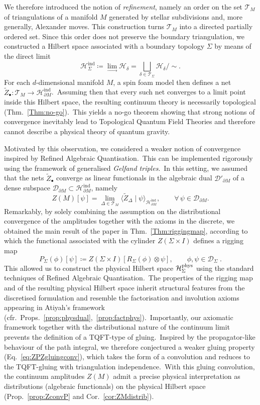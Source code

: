\documentclass[11pt]{article}
\newcommand{\Hphys}{\mathcal{H}_{\Sigma}^{\rm phys}}
\theoremstyle{definition}
\numberwithin{equation}{section}
\begin{document}
We therefore introduced the notion of \emph{refinement}, namely an order on the set $\mathcal{T}_M$ of triangulations of a manifold $M$ generated by stellar subdivisions and, more generally, Alexander moves. This construction turns $\mathcal{T}_M$ into a directed partially ordered set. Since this order does not preserve the boundary triangulation, we constructed a Hilbert space associated with a boundary topology $\Sigma$ by means of the direct limit
\[
\mathcal{H}^{\mathrm{ind}}_\Sigma \coloneqq 
\lim_{\longrightarrow}\mathcal{H}_\delta
=
\bigsqcup_{\delta\in \mathcal{T}_\Sigma}\mathcal{H}_\delta \Big/ \sim .
\]
For each $d$-dimensional manifold $M$, a spin foam model then defines a net 
$\tilde{Z}_\bullet : \mathcal{T}_M \to \mathcal{H}^{\mathrm{ind}}_{\partial M}$.~Assuming then that every such net converges to a limit point inside this Hilbert space, the resulting continuum theory is necessarily topological (Thm.~\ref{Thm:no-go}).~This yields a no-go theorem showing that strong notions of convergence inevitably lead to Topological Quantum Field Theories and therefore cannot describe a physical theory of quantum gravity.

Motivated by this observation, we considered a weaker notion of convergence inspired by Refined Algebraic Quantisation.~This can be implemented rigorously using the framework of generalised \emph{Gelfand triples}.~In this setting, we assumed that the nets $\tilde{Z}_\bullet$ converge as linear functionals in the algebraic dual $\mathcal{D}'_{\partial M}$ of a dense subspace $\mathcal{D}_{\partial M}\subset\mathcal{H}^{\mathrm{ind}}_{\partial M}$, namely
\[
Z(M)[\psi]
=
\lim_{\Delta\in\mathcal{T}_M}
\langle \tilde{Z}_\Delta \mid \psi \rangle_{\mathcal{H}^{\mathrm{ind}}_{\partial M}},
\qquad
\forall\,\psi\in\mathcal{D}_{\partial M}.
\]
Remarkably, by solely combining the assumption on the distributional convergence of the amplitudes together with the axioms in the discrete, we obtained the main result of the paper in Thm.~\ref{Thm:riggingmap}, according to which the functional associated with the cylinder $Z(\Sigma\times I)$ defines a rigging map
\[
P_\Sigma(\phi)[\psi]
\coloneqq
Z(\Sigma\times I)[R_\Sigma(\phi)\otimes\psi],
\qquad
\phi,\psi\in\mathcal{D}_\Sigma\;.
\]
This allowed us to construct the physical Hilbert space $\Hphys$ using the standard techniques of Refined Algebraic Quantisation.~The properties of the rigging map and of the resulting physical Hilbert space inherit structural features from the discretised formulation and resemble the factorisation and involution axioms appearing in Atiyah’s framework (cfr.~Props.~\ref{prop:physdual},~\ref{prop:factphys}).~Importantly, our axiomatic framework together with the distributional nature of the continuum limit prevents the definition of a TQFT-type of gluing.~Inspired by the propagator-like behaviour of the path integral, we therefore conjectured a weaker gluing property (Eq.~\eqref{eq:ZPZgluingconv}), which takes the form of a convolution and reduces to the TQFT-gluing with triangulation independence.~With this gluing convolution, the continuum amplitudes $Z(M)$ admit a precise physical interpretation as distributions (algebraic functionals) on the physical Hilbert space (Prop.~\ref{prop:ZconvP} and Cor.~\ref{cor:ZMdistrib}).
\end{document}
